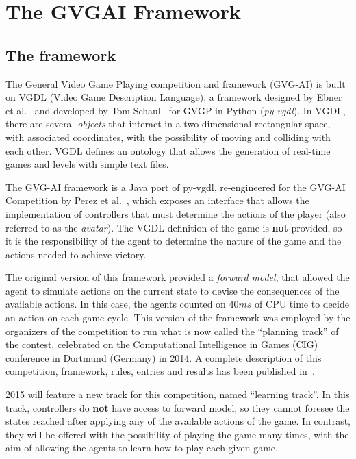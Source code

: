 \documentclass[conference]{IEEEtran}
\begin{document}
\section{The GVGAI Framework} \label{sec:framework}


\subsection{The framework} \label{ssec:framework}

The General Video Game Playing competition and framework (GVG-AI) is built on VGDL (Video Game Description Language), a framework designed by Ebner et al.~\cite{Ebner2013} and developed by Tom Schaul~\cite{schaul2013pyvgdl} for GVGP in Python (\textit{py-vgdl}). In VGDL, there are several \textit{objects} that interact in a two-dimensional rectangular space, with associated coordinates, with the possibility of moving and colliding with each other. VGDL defines an ontology that allows the generation of real-time games and levels with simple text files.

The GVG-AI framework is a Java port of py-vgdl, re-engineered for the GVG-AI Competition by Perez et al.~\cite{Perez2015}, which exposes an interface that allows the implementation of controllers that must determine the actions of the player (also referred to as the \textit{avatar}). The VGDL definition of the game is \textbf{not} provided, so it is the responsibility of the agent to determine the nature of the game and the actions needed to achieve victory. 

The original version of this framework provided a \textit{forward model}, that allowed the agent to simulate actions on the current state to devise the consequences of the available actions. In this case, the agents counted on $40ms$ of CPU time to decide an action on each game cycle. This version of the framework was employed by the organizers of the competition to run what is now called the ``planning track'' of the contest, celebrated on the Computational Intelligence in Games (CIG) conference in Dortmund (Germany) in 2014. A complete description of this competition, framework, rules, entries and results has been published in~\cite{Perez2015}.

2015 will feature a new track for this competition, named ``learning track''. In this track, controllers do \textbf{not} have access to forward model, so they cannot foresee the states reached after applying any of the available actions of the game. In contrast, they will be offered with the possibility of playing the game many times, with the aim of allowing the agents to learn how to play each given game. 
\end{document}
